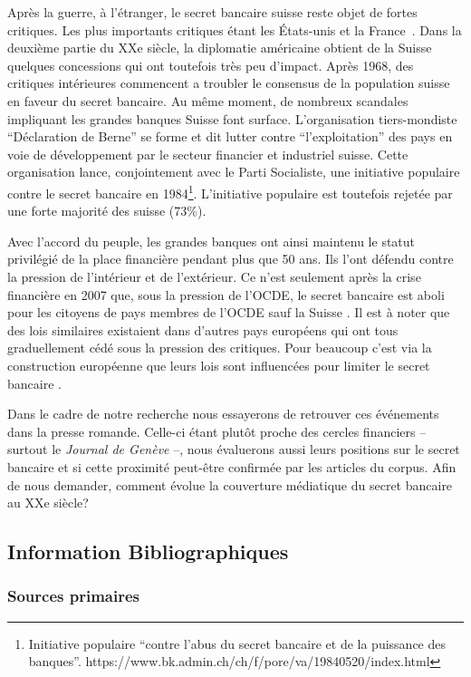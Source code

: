 \documentclass[a4paper, 11pt]{article}
\begin{document}
Après la guerre, à l'étranger, le secret bancaire suisse reste objet de fortes
critiques. Les plus importants critiques étant les États-unis et la
France~\citep[p. 503]{Mazbouri12}. Dans la deuxième partie du XXe siècle, la
diplomatie américaine obtient de la Suisse quelques concessions qui ont
toutefois très peu d'impact. Après 1968, des critiques intérieures commencent a
troubler le consensus de la population suisse en faveur du secret bancaire. Au
même moment, de nombreux scandales impliquant les grandes banques Suisse font
surface. L’organisation tiers-mondiste “Déclaration de Berne” \citep{EvB} se
forme et dit lutter contre ``l'exploitation'' des pays en voie de développement
par le secteur financier et industriel suisse. Cette organisation lance,
conjointement avec le Parti Socialiste, une initiative populaire contre le
secret bancaire en 1984\footnote{Initiative populaire ``contre l'abus du secret
bancaire et de la puissance des banques''.
https://www.bk.admin.ch/ch/f/pore/va/19840520/index.html}. L'initiative
populaire est toutefois rejetée par une forte majorité des suisse (73\%).

Avec l'accord du peuple, les grandes banques ont ainsi maintenu le
statut privilégié de la place financière pendant plus que 50 ans. Ils l’ont
défendu contre la pression de l’intérieur et de l’extérieur. Ce n’est
seulement après la crise financière en 2007 que, sous la pression de l'OCDE,
le secret bancaire est aboli pour les citoyens de pays membres de l'OCDE
sauf la Suisse \citep{NeufVies}.
Il est à noter que des lois similaires existaient dans d'autres pays européens
qui ont tous graduellement cédé sous la pression des critiques. Pour beaucoup
c'est via la construction européenne que leurs lois sont influencées pour
limiter le secret bancaire \citep[p. 32]{Palan09}.

Dans le cadre de notre recherche nous essayerons de retrouver ces événements
dans la presse romande. Celle-ci étant plutôt proche des cercles financiers –
surtout le \textit{Journal de Genève} \citep{ConfClass1} –, nous évaluerons aussi
leurs positions sur le secret bancaire et si cette proximité peut-être
confirmée par les articles du corpus. Afin de nous demander, comment évolue la
couverture médiatique du secret bancaire au XXe siècle?

\subsection{Information Bibliographiques}
\subsubsection{Sources primaires}
\end{document}
